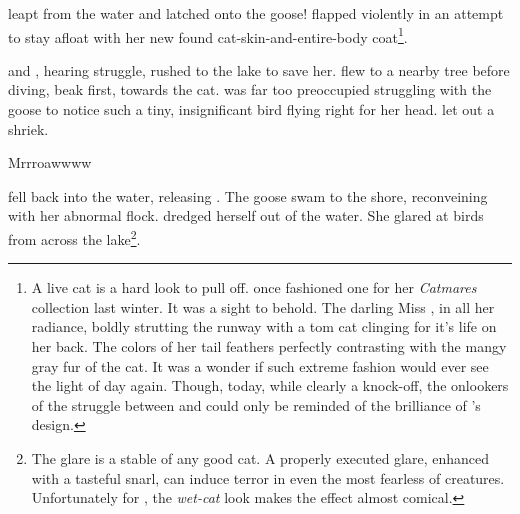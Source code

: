 \noindent
\pixel{} leapt from the water and latched onto the goose!
\goose{} flapped violently in an attempt to stay afloat with her new found
cat-skin-and-entire-body coat\footnote{
A live cat is a hard look to pull off.  \peacockF{} once fashioned
one for her \textit{Catmares} collection last winter.  It was a sight to behold.
The darling Miss \peacock, in all her radiance, boldly strutting the runway
with a tom cat clinging for it's life on her back.  The colors of her tail feathers
perfectly contrasting with the mangy gray fur of the cat.  It was a wonder if
such extreme fashion would ever see the light of day again.
Though, today, while clearly a knock-off, the onlookers of the struggle between
\goose{} and \pixel{} could only be reminded of the brilliance of \peacock's design.
}.
\VV


\noindent
\pidgenF{} and \doveF, hearing \goose{} struggle, rushed to the lake to save her.
\dove{} flew to a nearby tree before diving, beak first, towards the cat.
\pixel{} was far too preoccupied struggling with the goose to notice such a tiny,
insignificant bird flying right for her head.  \pixel{} let out a shriek.
\VV


{\Large}Mrrroawwww\normalsize
\VV


\pixel{} fell back into the water, releasing \goose.  The goose swam to the
shore, reconveining with her abnormal flock.
\pixel{} dredged herself out of the water.
She glared at birds from across the lake\footnote{
The glare is a stable of any good cat.  A properly executed
glare, enhanced with a tasteful snarl, can induce terror in even
the most fearless of creatures.  Unfortunately for \pixel, the
\textit{wet-cat} look makes the effect almost comical.
}.

